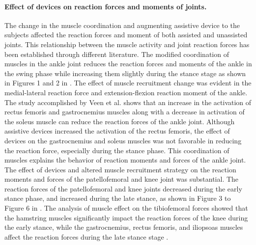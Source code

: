 \documentclass[10pt,letterpaper]{article}
\begin{document}
\paragraph*{Effect of devices on reaction forces and moments of joints.} The change in the muscle coordination and augmenting assistive device to the subjects affected the reaction forces and moment of both assisted and unassisted joints. This relationship between the muscle activity and joint reaction forces has been established through different literature\cite{171,170,173,174}. The modified coordination of muscles in the ankle joint reduces the reaction forces and moments of the ankle in the swing phase while increasing them slightly during the stance stage as shown in Figures 1 and 2 in . The effect of muscle recruitment change was evident in the medial-lateral reaction force and extension-flexion reaction moment of the ankle. The study accomplished by Veen et al. \cite{170} shows that an increase in the activation of rectus femoris and gastrocnemius muscles along with a decrease in activation of the soleus muscle can reduce the reaction forces of the ankle joint. Although assistive devices increased the activation of the rectus femoris, the effect of devices on the gastrocnemius and soleus muscles was not favorable in reducing the reaction force, especially during the stance phase. This coordination of muscles explains the behavior of reaction moments and forces of the ankle joint.\\
The effect of devices and altered muscle recruitment strategy on the reaction moments and forces of the patellofemoral and knee joint was substantial. The reaction forces of the patellofemoral and knee joints decreased during the early stance phase, and increased during the late stance, as shown in Figure 3 to Figure 6 in . The analysis of muscle effect on the tibiofemoral forces showed that the hamstring muscles significantly impact the reaction forces of the knee during the early stance, while the gastrocnemius, rectus femoris, and iliopsoas muscles affect the reaction forces during the late stance stage \cite{171,170}.\\
\end{document}
